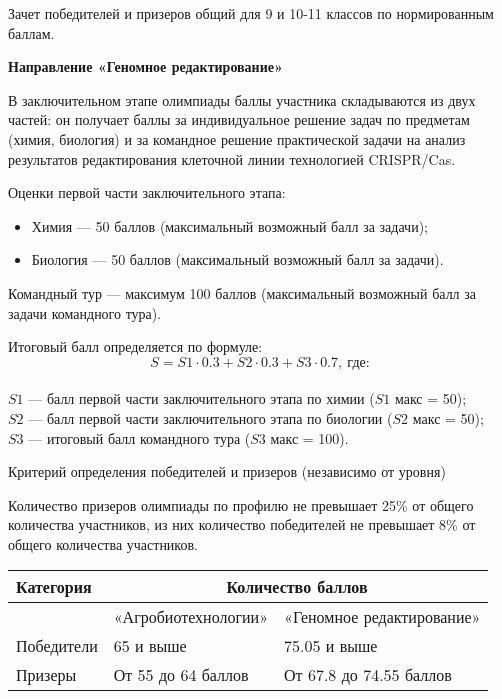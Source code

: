 Зачет победителей и призеров общий для 9 и 10-11 классов по нормированным баллам.

\textbf{Направление «Геномное редактирование»}

В заключительном этапе олимпиады баллы участника складываются из двух частей: он получает баллы за индивидуальное решение задач по предметам (химия, биология) и за командное решение практической задачи на анализ результатов редактирования клеточной линии технологией CRISPR/Cas.

Оценки первой части заключительного этапа:
\begin{itemize}
    \item Химия — 50 баллов (максимальный возможный балл за задачи);
    \item Биология — 50 баллов (максимальный возможный балл за задачи).
\end{itemize}

Командный тур — максимум 100 баллов (максимальный возможный балл за задачи командного тура).

Итоговый балл определяется по формуле: $$S = S1 \cdot 0.3 + S2 \cdot 0.3 + S3 \cdot 0.7, \: \text{где:}$$ \\
$S1$ — балл первой части заключительного этапа по химии ($S1$ макс = 50);\\
$S2$ — балл первой части заключительного этапа по биологии ($S2$ макс = 50);\\
$S3$ — итоговый балл командного тура ($S3$ макс = 100).

Критерий определения победителей и призеров (независимо от уровня)

Количество призеров олимпиады по профилю не превышает 25\% от общего количества участников, из них количество победителей не превышает 8\% от общего количества участников.

\begin{center}
    \begin{tabular}{|l|l|l|}
        \hline
        Категория& \multicolumn{2}{|c|}{Количество баллов} \\
        \hline
        &«Агробиотехнологии»&«Геномное редактирование»\\
        \hline
        Победители&65 и выше&75.05 и выше\\
        \hline
        Призеры&От 55 до 64 баллов&От 67.8 до 74.55 баллов\\
        \hline
    \end{tabular}
\end{center}